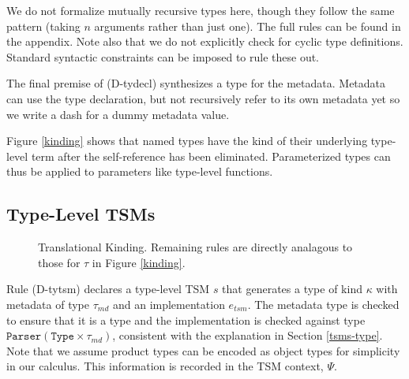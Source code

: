 \documentclass{sig-alternate}
\newcommand{\flyingbox}[1]{\fbox{{#1}}}
\newcommand{\mycaption}[1]{\vspace{-4px}\caption{#1}\vspace{-2px}}
\begin{document}
We do not formalize mutually recursive types here, though they follow the same pattern (taking $n$ arguments rather than just one). The full rules can be found in the appendix. Note also that we do not explicitly check for cyclic type definitions. Standard syntactic constraints can be imposed to rule these out. 

The final premise of (D-tydecl) synthesizes a type for the metadata. Metadata can use  the type declaration, but not recursively refer to its own metadata yet so we write a dash for a dummy metadata value.

Figure \ref{kinding} shows that named types have the kind of their underlying type-level term after the self-reference has been eliminated. Parameterized types can thus be applied to parameters like type-level functions.

\subsection{Type-Level TSMs}

\begin{figure}[t]
\flyingbox{$\Delta;\Delta\vdash_{\Theta}\hat{\tau}\rightsquigarrow \tau::\kappa$}
\vspace{-6px}
\begin{center}

\noLine
\BIC{}
\DP
\end{center}
\begin{center}

\DP
\end{center}
\mycaption{Translational Kinding. Remaining rules are directly analagous to those for $\tau$ in Figure \ref{kinding}.}
\label{tr-kinding}
\end{figure}
Rule (D-tytsm) declares a type-level TSM $s$ that generates a type of kind $\kappa$ with metadata of type $\tau_{md}$ and an implementation $e_{tsm}$. The metadata type is checked to ensure that it is a type and the implementation is checked against type $\mathtt{Parser}(\mathtt{Type} \times \tau_{md})$, consistent with the explanation in Section \ref{tsms-type}. Note that we assume product types can be encoded as object types for simplicity in our calculus. This information is recorded in the TSM context, $\Psi$.
\end{document}
